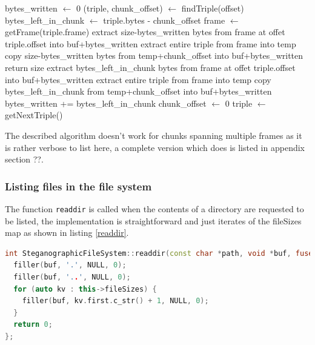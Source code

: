 \documentclass[paper=a4, fontsize=11pt,twoside]{scrartcl}    %
\numberwithin{table}{section}
\numberwithin{figure}{section}
\numberwithin{algorithm}{section}
\begin{document}
\begin{algorithm}[!ht]
\caption{Reading from the file system.}
\label{read}
\begin{algorithmic}[1]
\State bytes\_written $\gets$ 0
\State (triple, chunk\_offset) $\gets$ findTriple(offset)
	\State bytes\_left\_in\_chunk $\gets$ triple.bytes - chunk\_offset
	\State frame $\gets$ getFrame(triple.frame)
			\State extract size-bytes\_written bytes from frame at offet triple.offset into buf+bytes\_written
		\Else
			\State extract entire triple from frame into temp
			\State copy size-bytes\_written bytes from temp+chunk\_offset into buf+bytes\_written 
		\EndIf
		\State return size
	\EndIf
		\State extract bytes\_left\_in\_chunk bytes from frame at offet triple.offset into buf+bytes\_written
	\Else
		\State extract entire triple from frame into temp
		\State copy bytes\_left\_in\_chunk from temp+chunk\_offset into buf+bytes\_written 
	\EndIf
	\State bytes\_written += bytes\_left\_in\_chunk
	\State chunk\_offset $\gets$ 0
	\State triple $\gets$ getNextTriple()
\EndWhile
\end{algorithmic}
\end{algorithm}

The described algorithm doesn't work for chunks spanning multiple frames as it is rather verbose to list here, a complete version which does is listed in appendix section ??.

\subsubsection{Listing files in the file system}

The function \texttt{readdir} is called when the contents of a directory are requested to be listed, the implementation is straightforward and just iterates of the fileSizes map as shown in listing \ref{readdir}.

\begin{lstlisting}[language=C++, caption={\texttt{FUSE} readdir implementation (\texttt{fs/stegfs.cc:264}).}, frame=single, label=readdir,upquote=true]
int SteganographicFileSystem::readdir(const char *path, void *buf, fuse_fill_dir_t filler, off_t offset, struct fuse_file_info *fi) {
  filler(buf, '.', NULL, 0);
  filler(buf, '..', NULL, 0);
  for (auto kv : this->fileSizes) {
    filler(buf, kv.first.c_str() + 1, NULL, 0);
  }
  return 0;
};
\end{lstlisting}
\end{document}

